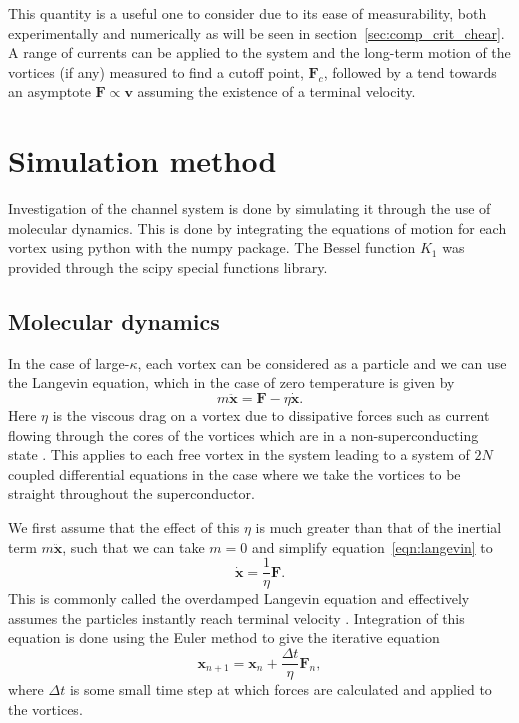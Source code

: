 \documentclass{article}
\numberwithin{equation}{section}
\begin{document}
This quantity is a useful one to consider due to its ease of measurability, both experimentally and numerically as will be seen in section~\ref{sec:comp_crit_chear}. A range of currents can be applied to the system and the long-term motion of the vortices (if any) measured to find a cutoff point, $\mathbf{F}_c$, followed by a tend towards an asymptote $\mathbf{F} \propto \mathbf{v}$ assuming the existence of a terminal velocity.

\section{Simulation method}
Investigation of the channel system is done by simulating it through the use of molecular dynamics. This is done by integrating the equations of motion for each vortex using python with the numpy package. The Bessel function $K_1$ was provided through the scipy special functions library.
\subsection{Molecular dynamics}
In the case of large-$\kappa$, each vortex can be considered as a particle and we can use the Langevin equation, which in the case of zero temperature is given by
\begin{equation}
    m\ddot{\mathbf{x}} = \mathbf{F} - \eta\dot{\mathbf{x}}. \label{eqn:langevin}
\end{equation}
Here $\eta$ is the viscous drag on a vortex due to dissipative forces such as current flowing through the cores of the vortices which are in a non-superconducting state \cite{Bardeen1965TheorySuperconductors, Watkins2016DensitySuperconductors}. This applies to each free vortex in the system leading to a system of $2N$ coupled differential equations in the case where we take the vortices to be straight throughout the superconductor.

We first assume that the effect of this $\eta$ is much greater than that of the inertial term $m\ddot{\mathbf{x}}$, such that we can take $m=0$ and simplify equation~\ref{eqn:langevin} to
\begin{equation}
    \dot{\mathbf{x}} = \frac{1}{\eta}\mathbf{F}. \label{eqn:langevin_ovdamp}
\end{equation}
This is commonly called the overdamped Langevin equation and effectively assumes the particles instantly reach terminal velocity \cite{Poole2014Superconductivity}.
Integration of this equation is done using the Euler method to give the iterative equation
\begin{equation}
    \mathbf{x}_{n+1} = \mathbf{x}_n + \frac{\Delta t}{\eta}\mathbf{F}_n,
\end{equation}
where $\Delta t$ is some small time step at which forces are calculated and applied to the vortices.
\end{document}
